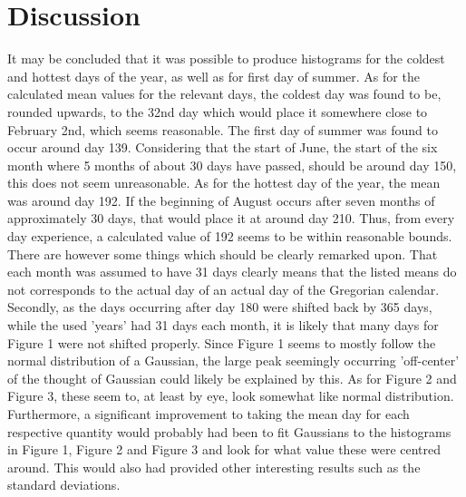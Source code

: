 \documentclass[a4, 12pt]{article}
\begin{document}





\newpage
\section{Discussion}
It may be concluded that it was possible to produce histograms for the coldest and hottest days of the year, as well as for first day of summer. As for the calculated mean values for the relevant days, the coldest day was found to be, rounded upwards, to the 32nd day which would place it somewhere close to February 2nd, which seems reasonable. The first day of summer was found to occur around day 139. Considering that the start of June, the start of the six month where 5 months of about 30 days have passed, should be around day 150, this does not seem unreasonable. As for the hottest day of the year, the mean was around day 192. If the beginning of August occurs after seven months of approximately 30 days, that would place it at around day 210. Thus, from every day experience, a calculated value of 192 seems to be within reasonable bounds. \newline 
\indent There are however some things which should be clearly remarked upon. That each month was assumed to have 31 days clearly means that the listed means do not corresponds to the actual day of an actual day of the Gregorian calendar. Secondly, as the days occurring after day 180 were shifted back by 365 days, while the used 'years' had 31 days each month, it is likely that many days for Figure 1 were not shifted properly. Since Figure 1 seems to mostly follow the normal distribution of a Gaussian, the large peak seemingly occurring 'off-center' of the thought of Gaussian could likely be explained by this. As for Figure 2 and Figure 3, these seem to, at least by eye, look somewhat like normal distribution. Furthermore, a significant improvement to taking the mean day for each respective quantity would probably had been to fit Gaussians to the histograms in Figure 1, Figure 2 and Figure 3 and look for what value these were centred around. This would also had provided other interesting results such as the standard deviations. \newline
\end{document}
